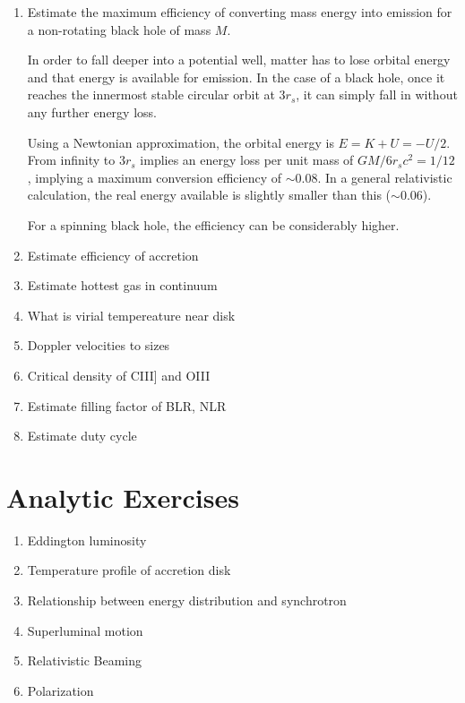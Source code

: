 \begin{enumerate} 
\item Estimate the maximum efficiency of converting mass energy
    into emission for a non-rotating black hole of mass $M$.

\begin{answer}
In order to fall deeper into a potential well, matter has to lose
orbital energy and that energy is available for emission. In the case
of a black hole, once it reaches the innermost stable circular orbit
at $3r_s$, it can simply fall in without any further energy loss.

Using a Newtonian approximation, the orbital energy is $E = K + U =
-U/2$. From infinity to $3r_s$ implies an energy loss per unit mass of
$GM/6r_sc^2 = 1 / 12$, implying a maximum conversion efficiency of
$\sim 0.08$. In a general relativistic calculation, the real energy
available is slightly smaller than this ($\sim 0.06$).

For a spinning black hole, the efficiency can be considerably higher.
\end{answer}

\item Estimate efficiency of accretion
\item Estimate hottest gas in continuum
\item What is virial tempereature near disk
\item Doppler velocities to sizes
\item Critical density of CIII] and OIII
\item Estimate filling factor of BLR, NLR
\item Estimate duty cycle
\end{enumerate} 

\section{Analytic Exercises}

\begin{enumerate}
\item Eddington luminosity
\item Temperature profile of accretion disk
\item Relationship between energy distribution and synchrotron
\item Superluminal motion
\item Relativistic Beaming
\item Polarization
\end{enumerate}

